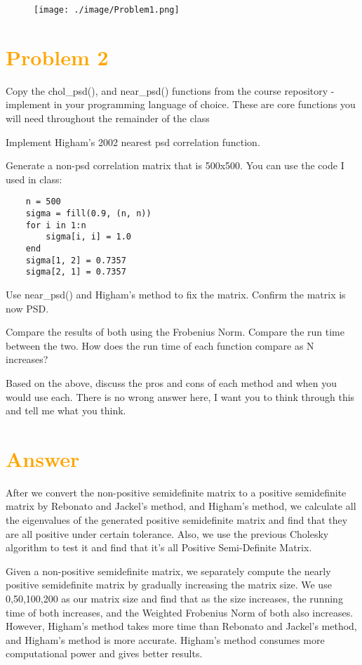\documentclass[11pt,en]{elegantpaper}
\begin{document}
\begin{figure}[htbp] 
    \centering 
    \texttt{[image: ./image/Problem1.png]} 
\end{figure}

\section*{\textcolor{orange}{Problem 2}}
Copy the chol\_psd(), and near\_psd() functions from the course repository - 
implement in your programming language of choice. These are core functions 
you will need throughout the remainder of the class

Implement Higham's 2002 nearest psd correlation function.

Generate a non-psd correlation matrix that is 500x500.  
You can use the code I used in class:

\begin{lstlisting}
    n = 500  
    sigma = fill(0.9, (n, n))  
    for i in 1:n  
        sigma[i, i] = 1.0  
    end  
    sigma[1, 2] = 0.7357  
    sigma[2, 1] = 0.7357
\end{lstlisting}

Use near\_psd() and Higham's method to fix the matrix. Confirm the matrix is now PSD.

Compare the results of both using the Frobenius Norm. 
Compare the run time between the two. How does the run time of each function compare as N increases?

Based on the above, discuss the pros and cons of each method and when you would 
use each. There is no wrong answer here, I want you to think through this and 
tell me what you think.

\section*{\textcolor{orange}{Answer}}

After we convert the non-positive semidefinite matrix to a positive semidefinite matrix by 
Rebonato and Jackel's method, and Higham's method, we calculate all the eigenvalues of the generated 
positive semidefinite matrix and find that they are all positive under certain tolerance. Also, we use 
the previous Cholesky algorithm to test it and find that it's all Positive Semi-Definite Matrix.

Given a non-positive semidefinite matrix, we separately compute the nearly positive semidefinite 
matrix by gradually increasing the matrix size. We use 0,50,100,200 as our matrix size and find that 
as the size increases, the running time of both increases, and the Weighted Frobenius Norm of both also 
increases. However, Higham's method takes more time than Rebonato and Jackel's method, and Higham's method 
is more accurate. Higham's method consumes more computational power and gives better results.
\end{document}
